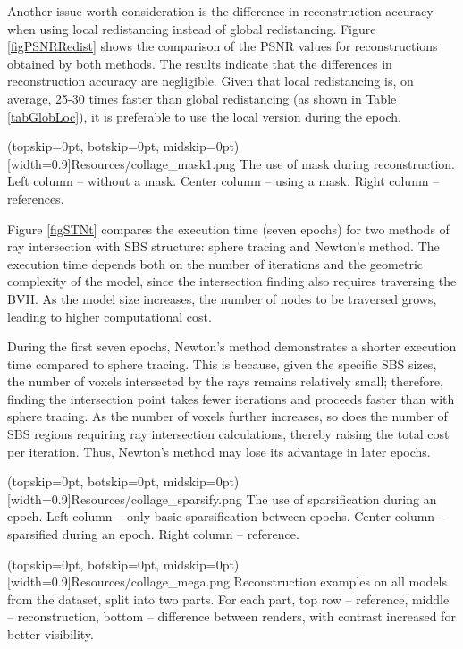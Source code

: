 \documentclass{ieeeaccess}
\begin{document}
Another issue worth consideration is the difference in reconstruction accuracy when using local redistancing instead of global redistancing. Figure \ref{figPSNRRedist} shows the comparison of the PSNR values for reconstructions obtained by both methods. The results indicate that the differences in reconstruction accuracy are negligible. Given that local redistancing is, on average, 25-30 times faster than global redistancing (as shown in Table \ref{tabGlobLoc}), it is preferable to use the local version during the epoch.

\Figure[htbp](topskip=0pt, botskip=0pt, midskip=0pt)[width=0.9\linewidth]{Resources/collage_mask1.png} {
    The use of mask during reconstruction. Left column -- without a mask. Center column -- using a mask. Right column -- references. \label{figAblMask}
}

Figure \ref{figSTNt} compares the execution time (seven epochs) for two methods of ray intersection with SBS structure: sphere tracing and Newton's method. The execution time depends both on the number of iterations and the geometric complexity of the model, since the intersection finding also requires traversing the BVH. As the model size increases, the number of nodes to be traversed grows, leading to higher computational cost.

During the first seven epochs, Newton's method demonstrates a shorter execution time compared to sphere tracing. This is because, given the specific SBS sizes, the number of voxels intersected by the rays remains relatively small; therefore, finding the intersection point takes fewer iterations and proceeds faster than with sphere tracing. As the number of voxels further increases, so does the number of SBS regions requiring ray intersection calculations, thereby raising the total cost per iteration. Thus, Newton's method may lose its advantage in later epochs.

\Figure[htbp](topskip=0pt, botskip=0pt, midskip=0pt)[width=0.9\linewidth]{Resources/collage_sparsify.png} {
    The use of sparsification during an epoch. Left column -- only basic sparsification between epochs. Center column -- sparsified during an epoch. Right column -- reference. \label{figAblSparsify}
}

\Figure[h](topskip=0pt, botskip=0pt, midskip=0pt)[width=0.9\textwidth]{Resources/collage_mega.png} {
    Reconstruction examples on all models from the dataset, split into two parts. For each part, top row -- reference, middle -- reconstruction, bottom -- difference between renders, with contrast increased for better visibility.\label{figExamples}
}
\end{document}
